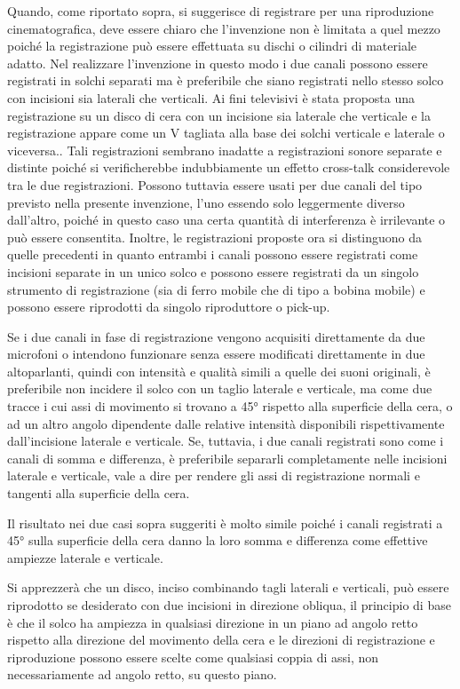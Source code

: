 \documentclass[11pt]{article}
\begin{document}
\begin{multicols*}{2}
Quando, come riportato sopra, si suggerisce di registrare per una riproduzione cinematografica, deve essere chiaro che l'invenzione non è limitata a quel mezzo poiché la registrazione può essere effettuata su dischi o cilindri di materiale adatto. Nel realizzare l'invenzione in questo modo i due canali possono essere registrati in solchi separati ma è preferibile che siano registrati nello stesso solco con incisioni sia laterali che verticali. Ai fini televisivi è stata proposta una registrazione su un disco di cera con un incisione sia laterale che verticale e la registrazione appare come un V tagliata alla base dei solchi verticale e laterale o viceversa.. Tali registrazioni sembrano inadatte a registrazioni sonore separate e distinte poiché si verificherebbe indubbiamente un effetto cross-talk considerevole tra le due registrazioni. Possono tuttavia essere usati per due canali del tipo previsto nella presente invenzione, l'uno essendo solo leggermente diverso dall'altro, poiché in questo caso una certa quantità di interferenza è irrilevante o può essere consentita. Inoltre, le registrazioni proposte ora si distinguono da quelle precedenti in quanto entrambi i canali possono essere registrati come incisioni separate in un unico solco e possono essere registrati da un singolo strumento di registrazione (sia di ferro mobile che di tipo a bobina mobile) e possono essere riprodotti da singolo riproduttore o pick-up.

Se i due canali in fase di registrazione vengono acquisiti direttamente da due microfoni o intendono funzionare senza essere modificati direttamente in due altoparlanti, quindi con intensità e qualità simili a quelle dei suoni originali, è preferibile non incidere il solco con un taglio laterale e verticale, ma come due tracce i cui assi di movimento si trovano a 45° rispetto alla superficie della cera, o ad un altro angolo dipendente dalle relative intensità disponibili rispettivamente dall’incisione laterale e verticale. Se, tuttavia, i due canali registrati sono come i canali di somma e differenza, è preferibile separarli completamente nelle incisioni laterale e verticale, vale a dire per rendere gli assi di registrazione normali e tangenti alla superficie della cera.
 
Il risultato nei due casi sopra suggeriti è molto simile poiché i canali registrati a 45° sulla superficie della cera danno la loro somma e differenza come effettive ampiezze laterale e verticale.
 
Si apprezzerà che un disco, inciso combinando tagli laterali e verticali, può essere riprodotto se desiderato con due incisioni in direzione obliqua, il principio di base è che il solco ha ampiezza in qualsiasi direzione in un piano ad angolo retto rispetto alla direzione del movimento della cera e le direzioni di registrazione e riproduzione possono essere scelte come qualsiasi coppia di assi, non necessariamente ad angolo retto, su questo piano.


\end{multicols*}
\end{document}
